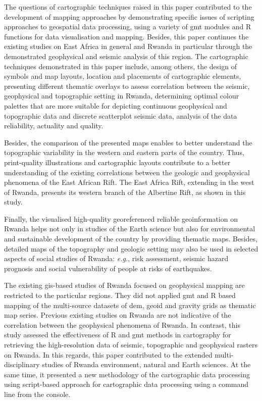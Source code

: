 \documentclass[myclassdoc,debug]{rjparticle}
\begin{document}
The questions of cartographic techniques raised in this paper contributed to the development of mapping approaches by demonstrating specific issues of scripting approaches to geospatial data processing, using a variety of \ac{gmt} modules and R functions for data visualisation and mapping. Besides, this paper continues the existing studies on East Africa in general and Rwanda in particular through the demonstrated geophysical and seismic analysis of this region. The cartographic techniques demonstrated in this paper include, among others, the design of symbols and map layouts, location and placements of cartographic elements, presenting different thematic overlays to assess correlation between the seismic, geophysical and topographic setting in Rwanda, determining optimal colour palettes that are more suitable for depicting continuous geophysical and topographic data and discrete scatterplot seismic data, analysis of the data reliability, actuality and quality. 

Besides, the comparison of the presented maps enables to better understand the topographic variability in the western and eastern parts of the country. Thus, print-quality illustrations and cartographic layouts contribute to a better understanding of the existing correlations between the geologic and geophysical phenomena of the East African Rift. The East Africa Rift, extending in the west of Rwanda, presents its western branch of the Albertine Rift, as shown in this study. 

Finally, the visualised high-quality georeferenced reliable geoinformation on Rwanda helps not only in studies of the Earth science but also for environmental and sustainable development of the country by providing thematic maps. Besides, detailed maps of the topography and geologic setting may also be used in selected aspects of social studies of Rwanda: \emph{e.g.}, risk assessment, seismic hazard prognosis and social vulnerability of people at risks of earthquakes. 

The existing \ac{gis}-based studies of Rwanda focused on geophysical mapping are restricted to the particular regions. They did not applied \ac{gmt} and R based mapping of the multi-source datasets of \ac{dem}, geoid and gravity grids as thematic map series. Previous existing studies on Rwanda are not indicative of the correlation between the geophysical phenomena of Rwanda. In contrast, this study assessed the effectiveness of R and \ac{gmt} methods in cartography for retrieving the high-resolution data of seismic, topographic and geophysical rasters on Rwanda. In this regards, this paper contributed to the extended multi-disciplinary studies of Rwanda environment, natural and Earth sciences. At the same time, it presented a new methodology of the cartographic data processing using script-based approach for cartographic data processing using a command line from the console. 
\end{document}
